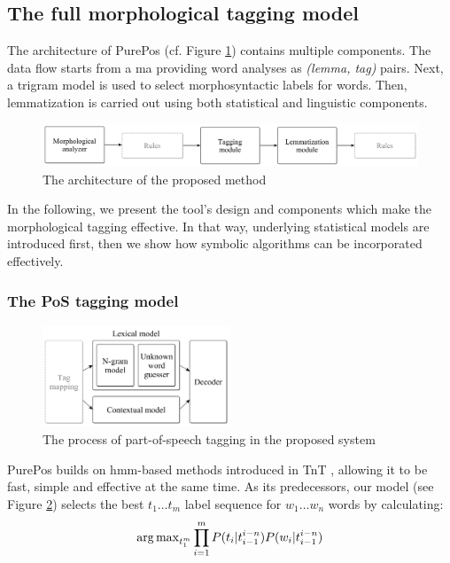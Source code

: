 \subsection{The full morphological tagging model}
\label{sec:purepos}

The architecture of PurePos (cf. Figure \ref{fig:purepos-arch}) contains multiple components. 
The data flow starts from a \gls{ma} providing word analyses as \emph{(lemma, tag)} pairs. 
Next, a trigram model is used to select morphosyntactic labels for words. 
Then, lemmatization is carried out using both statistical and linguistic components. 

\begin{figure}[H]
  \centering
  \includegraphics[width=1\textwidth]{MorphTagging/architecture.png} 
  \caption{The architecture of the proposed method}
  \label{fig:purepos-arch}
\end{figure}

In the following, we present the tool's design and components which make the morphological tagging effective. 
In that way,  underlying statistical models are introduced first, then we show how symbolic algorithms can be incorporated effectively. 

\subsubsection{The PoS tagging model}

\begin{figure}[H]
  \centering
  \includegraphics[width=0.5\textwidth]{MorphTagging/pos_arch.png} 
  \caption{The process of part-of-speech tagging in the proposed system}
  \label{fig:pos_arch}
\end{figure}

PurePos builds on \acrshort{hmm}-based methods \cite{Rabiner1989,Samuelsson1993} introduced in TnT \cite{Brants2000}, allowing it to be fast, simple and effective at the same time. 
As its predecessors, our model (see Figure \ref{fig:pos_arch}) selects the best $t_1 \dots t_m$ label sequence for $w_1 \dots w_n$ words by calculating:
\begin{equation}
\operatorname{arg\,max}_{t_1^m} \prod_{i=1}^m P(t_i | t_{i-1}^{i-n}) P(w_i|t_{i-1}^{i-n})
\end{equation}

